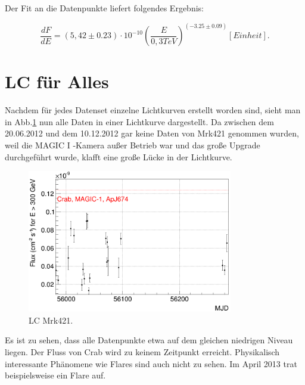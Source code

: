 Der Fit an die Datenpunkte liefert folgendes Ergebnis:

\begin{equation}
 \frac{dF}{dE}=(5,42 \pm 0.23) \cdot 10^{-10}\left( \frac{E}{0,3 \si{TeV}} \right)^{(-3.25 \pm 0.09)} [Einheit].
\end{equation}

\FloatBarrier


\section{LC für Alles}

Nachdem für jedes Datenset einzelne Lichtkurven erstellt worden sind, sieht man in Abb.\ref{Alles_LC_Mrk421} nun alle Daten in einer Lichtkurve dargestellt.
Da zwischen dem 20.06.2012 und dem 10.12.2012 gar keine Daten von Mrk421 genommen wurden, weil die MAGIC I -Kamera außer Betrieb war und das große Upgrade durchgeführt wurde, klafft eine große Lücke in der Lichtkurve.

\begin{figure}
    \centering
    \includegraphics[width=0.8\textwidth]{./Plots/04_MrkAnalyse/Alles_LC.png}
    \caption{LC Mrk421.}
    \label{Alles_LC_Mrk421}
\end{figure}

Es ist zu sehen, dass alle Datenpunkte etwa auf dem gleichen niedrigen Niveau liegen.
Der Fluss von Crab wird zu keinem Zeitpunkt erreicht. 
Physikalisch interessante Phänomene wie Flares sind auch nicht zu sehen.
Im April 2013 trat beispielsweise ein Flare auf.
